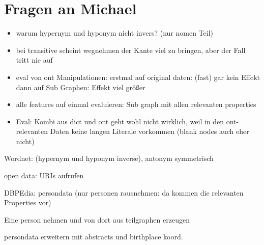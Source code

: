 \documentclass[a4paper]{scrartcl}
\begin{document}
\section{Fragen an Michael}

\begin{itemize}
	\item warum hypernym und hyponym nicht invers? (nur nomen Teil)
	\item bei transitive scheint wegnehmen der Kante viel zu bringen, aber der Fall tritt nie auf
	\item eval von ont Manipulationen: erstmal auf original daten: (fast) gar kein Effekt\\
	dann auf Sub Graphen: Effekt viel größer
	\item alle features auf einmal evaluieren: Sub graph mit allen relevanten properties
	\item Eval: Kombi aus dict und ont geht wohl nicht wirklich, weil in den ont-relevanten Daten keine langen Literale vorkommen (blank nodes auch eher nicht)
\end{itemize}

Wordnet: (hypernym und hyponym inverse), antonym symmetrisch

open data: URIs aufrufen



DBPEdia: persondata (nur personen rausnehmen: da kommen die relevanten Properties vor)

Eine person nehmen und von dort aus teilgraphen erzeugen

persondata erweitern mit abstracts und birthplace koord.
\end{document}
